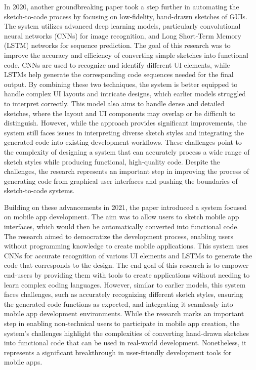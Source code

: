 In 2020, another groundbreaking paper \cite{9971204}took a step further in automating the sketch-to-code process by focusing on low-fidelity, hand-drawn sketches of GUIs. The system utilizes advanced deep learning models, particularly convolutional neural networks (CNNs) for image recognition, and Long Short-Term Memory (LSTM) networks for sequence prediction. The goal of this research was to improve the accuracy and efficiency of converting simple sketches into functional code. CNNs are used to recognize and identify different UI elements, while LSTMs help generate the corresponding code sequences needed for the final output. By combining these two techniques, the system is better equipped to handle complex UI layouts and intricate designs, which earlier models struggled to interpret correctly. This model also aims to handle dense and detailed sketches, where the layout and UI components may overlap or be difficult to distinguish. However, while the approach provides significant improvements, the system still faces issues in interpreting diverse sketch styles and integrating the generated code into existing development workflows. These challenges point to the complexity of designing a system that can accurately process a wide range of sketch styles while producing functional, high-quality code. Despite the challenges, the research represents an important step in improving the process of generating code from graphical user interfaces and pushing the boundaries of sketch-to-code systems. 

Building on these advancements in 2021, the paper \cite{Baule2021} introduced a system focused on mobile app development. The aim was to allow users to sketch mobile app interfaces, which would then be automatically converted into functional code. The research aimed to democratize the development process, enabling users without programming knowledge to create mobile applications. This system uses CNNs for accurate recognition of various UI elements and LSTMs to generate the code that corresponds to the design. The end goal of this research is to empower end-users by providing them with tools to create applications without needing to learn complex coding languages. However, similar to earlier models, this system faces challenges, such as accurately recognizing different sketch styles, ensuring the generated code functions as expected, and integrating it seamlessly into mobile app development environments. While the research marks an important step in enabling non-technical users to participate in mobile app creation, the system's challenges highlight the complexities of converting hand-drawn sketches into functional code that can be used in real-world development. Nonetheless, it represents a significant breakthrough in user-friendly development tools for mobile apps. 

